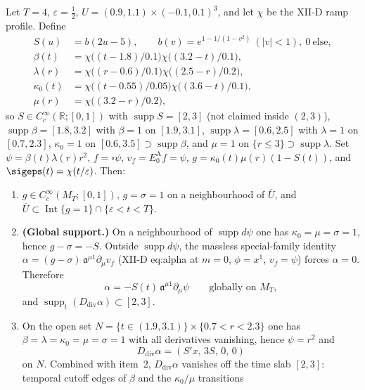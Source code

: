 \begin{lemma}
\label{lem:support}
Let $T=4$, $\varepsilon=\tfrac12$, $U=(0.9,1.1)\times(-0.1,0.1)^3$, and let
$\chi$ be the XII-D ramp profile. Define
\begin{align*}
S(u)&=b(2u-5),\qquad
b(v)=e^{1-1/(1-v^2)}\ (|v|<1),\ 0\ \text{else},\\
\beta(t)&=\chi\bigl((t-1.8)/0.1\bigr)\chi\bigl((3.2-t)/0.1\bigr),\\
\lambda(r)&=\chi\bigl((r-0.6)/0.1\bigr)\chi\bigl((2.5-r)/0.2\bigr),\\
\kappa_0(t)&=\chi\bigl((t-0.55)/0.05\bigr)\chi\bigl((3.6-t)/0.1\bigr),\\
\mu(r)&=\chi\bigl((3.2-r)/0.2\bigr),
\end{align*}
so $S\in C_c^\infty(\mathbb{R};[0,1])$ with $\operatorname{supp}S=[2,3]$ (not claimed
inside $(2,3)$),
$\operatorname{supp}\beta=[1.8,3.2]$ with $\beta=1$ on $[1.9,3.1]$,
$\operatorname{supp}\lambda=[0.6,2.5]$ with $\lambda=1$ on $[0.7,2.3]$,
$\kappa_0=1$ on $[0.6,3.5]\supset\operatorname{supp}\beta$, and
$\mu=1$ on $\{r\le3\}\supset\operatorname{supp}\lambda$.
Set $\psi=\beta(t)\lambda(r)r^2$, $f=\square\psi$, $v_f=E_0^{\mathrm A}f=\psi$,
$g=\kappa_0(t)\mu(r)(1-S(t))$, and $\sigeps(t)=\chi(t/\varepsilon)$.
Then:
\begin{enumerate}
\item $g\in C_c^\infty(M_T;[0,1])$, $g=\sigma=1$ on a neighbourhood of $\overline U$,
  and $\overline U\subset\operatorname{Int}\{g=1\}\cap\{\varepsilon<t<T\}$.
\item \textbf{(Global support.)}
  On a neighbourhood of $\operatorname{supp}d\psi$ one has $\kappa_0=\mu=\sigma=1$, hence
  $g-\sigma=-S$. Outside $\operatorname{supp}d\psi$, the massless special-family identity
  $\alpha=(g-\sigma)\,\mathfrak a^{\mu1}\partial_\mu v_f$ (XII-D eq:alpha at $m=0$,
  $\phi=x^1$, $v_f=\psi$) forces $\alpha=0$. Therefore
  \[
  \alpha=-S(t)\,\mathfrak a^{\mu1}\partial_\mu\psi
  \qquad\text{globally on }M_T,
  \]
  and $\operatorname{supp}_t(D_{\mathrm{div}}\alpha)\subset[2,3]$.
\item On the open set $N=\{t\in(1.9,3.1)\}\times\{0.7<r<2.3\}$ one has
  $\beta=\lambda=\kappa_0=\mu=\sigma=1$ with all derivatives vanishing, hence
  $\psi=r^2$ and
  \[
  D_{\mathrm{div}}\alpha=(S'x,\,3S,\,0,\,0)
  \]
  on $N$. Combined with item~2, $D_{\mathrm{div}}\alpha$ vanishes off the time slab
  $[2,3]$: temporal cutoff edges of $\beta$ and the $\kappa_0/\mu$ transitions

\end{enumerate}
\end{lemma}
